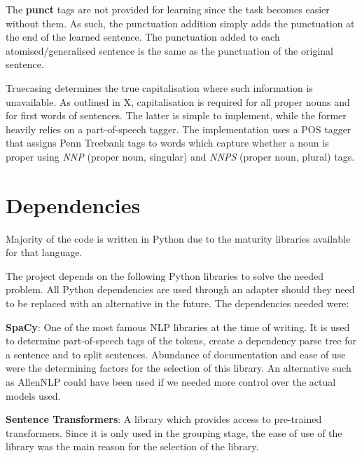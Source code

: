 The \textbf{punct} tags are not provided for learning since the task becomes easier without them. 
As such, the punctuation addition simply adds the punctuation at the end of the learned sentence.
The punctuation added to each atomised/generalised sentence is the same as the punctuation of the original sentence.

Truecasing determines the true capitalisation where such information is unavailable.
As outlined in X, capitalisation is required for all proper nouns and for first words of sentences. 
The latter is simple to implement, while the former heavily relies on a part-of-speech tagger. 
The implementation uses a POS tagger that assigns Penn Treebank tags to words which capture whether a noun is proper using \textit{NNP} (proper noun, singular) and \textit{NNPS} (proper noun, plural) tags.


\section{Dependencies}




Majority of the code is written in Python due to the maturity libraries available for that language. 

The project depends on the following Python libraries to solve the needed problem. 
All Python dependencies are used through an adapter should they need to be replaced with an alternative in the future.
The dependencies needed were:

\textbf{SpaCy}: One of the most famous NLP libraries at the time of writing. 
It is used to determine part-of-speech tags of the tokens, create a dependency parse tree for a sentence and to split sentences. 
Abundance of documentation and ease of use were the determining factors for the selection of this library. 
An alternative such as AllenNLP could have been used if we needed more control over the actual models used.

\textbf{Sentence Transformers}: A library which provides access to pre-trained transformers. 
Since it is only used in the grouping stage, the ease of use of the library was the main reason for the selection of the library.

